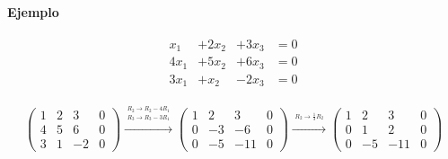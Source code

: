 \documentclass{article}
\begin{document}
\begin{large}
    \textbf{Ejemplo}
\end{large}

\begin{equation*}
    \begin{matrix}
        \begin{aligned}
            x_1 & +2x_2 & +3x_3 & =0\\
            4x_1 & +5x_2 & +6x_3 & =0\\
            3x_1 & +x_2 & -2x_3 & =0
        \end{aligned}
    \end{matrix}
\end{equation*}

\begin{equation}
    \left(\begin{array}{rrr|r}
    1 & 2 & 3 & 0 \\
    4 & 5 & 6 & 0 \\
    3 & 1 & -2 & 0
    \end{array}\right) 
    \xrightarrow{\overset{\begin{aligned} R_2 \rightarrow R_2 - 4R_1 \\ R_3 \rightarrow R_3 - 3R_1\end{aligned}}{}} 
    \left(\begin{array}{rrr|r}
    1 & 2 & 3 & 0 \\
    0 & -3 & -6 & 0 \\
    0 & -5 & -11 & 0
    \end{array}\right)
    \xrightarrow{\overset{\begin{aligned} R_2 \rightarrow \frac{1}{3} R_2 \end{aligned}}{}} 
    \left(\begin{array}{rrr|r}
    1 & 2 & 3 & 0 \\
    0 & 1 & 2 & 0 \\
    0 & -5 & -11 & 0
    \end{array}\right)
\end{equation}
\end{document}
